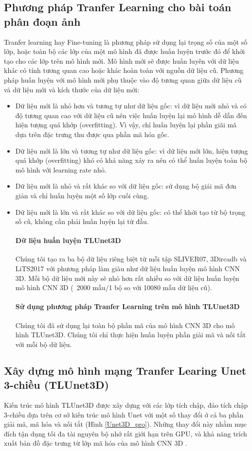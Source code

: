 \subsection{Phương pháp Tranfer Learning cho bài toán phân đoạn ảnh}
Tranfer learning hay Fine-tuning là phương pháp sử dụng lại trọng số của một số lớp, hoặc toàn bộ các lớp của một mô hình đã được huấn luyện trước đó để khởi tạo cho các lớp trên mô hình mới. Mô hình mới sẽ được huấn luyên với dữ liệu khác có tính tương quan cao hoặc khác hoàn toàn với nguồn dữ liệu cũ.
Phương pháp huấn luyện với mô hình mới phụ thuộc vào độ tương quan giữa dữ liệu cũ và dữ liệu mới và kích thước của dữ liệu mới:
\begin{itemize}
\item Dữ liệu mới là nhỏ hơn và tương tự như dữ liệu gốc: vì dữ liệu mới nhỏ và có độ tương quan cao với dữ liệu cũ nên việc huấn luyện lại mô hình dễ dẫn đến hiện tượng quá khớp (overfitting). Vì vậy, chỉ huấn luyện lại phần giãi mã dựa trên đặc trưng thu được qua phần mã hóa gốc.
\item Dữ liệu mới là lớn và tương tự như dữ liệu gốc: vì dữ liệu mới lớn, hiện tượng quá khớp (overfitting) khó có khả năng xảy ra nên có thể huấn luyện toàn bộ mô hình với learning rate nhỏ.
\item Dữ liệu mới là nhỏ và rất khác so với dữ liệu gốc: sử dụng bộ giải mã đơn giản và chỉ huấn luyện một số lớp cuối cùng.
\item Dữ liệu mới là lớn và rất khác so với dữ liệu gốc: có thể khởi tạo từ bộ trọng số cũ, không cần phải huấn luyện lại từ đầu.
\paragraph{Dữ liệu huấn luyện TLUnet3D} Chúng tôi tạo ra ba bộ dữ liệu riêng biệt từ mỗi tập SLIVER07, 3Dircadb và LiTS2017 với phương pháp làm giàu như dữ liệu huấn luyện mô hình CNN 3D. Mỗi bộ dữ liệu mới này sẽ nhỏ hơn rất nhiều so với dữ liệu huấn luyện mô hình CNN 3D (~2000 mẫu/1 bộ so với 10080 mẫu dữ liệu cũ).
\paragraph{Sử dụng phương pháp Tranfer Learning trên mô hình TLUnet3D} Chúng tôi đã sử dụng lại toàn bộ phần mã của mô hình CNN 3D cho mô hình TLUnet3D. Chúng tôi chỉ thực hiện huấn luyện phần giải mã và nối tắt với mỗi bộ dữ liệu.
\end{itemize}
\subsection{Xây dựng mô hình mạng Tranfer Learing Unet 3-chiều (TLUnet3D)}
Kiến trúc mô hình TLUnet3D được xây dựng với các lớp tích chập, đảo tích chập 3-chiều dựa trên cơ sở kiến trúc mô hình Unet \cite{unet_paper} với một số thay đổi ở cả ba phần giải mã, mã hóa và nối tắt (Hình \ref{Unet3D_pro}). Những thay đổi này nhằm mục đích tận dụng tối đa tài nguyên bộ nhớ rất giới hạn trên GPU, và khả năng trích xuất bản đồ đặc trưng từ lớp mã hóa của mô hình CNN 3D .
